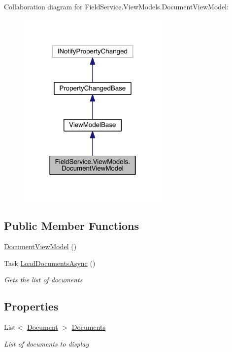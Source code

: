 Collaboration diagram for Field\+Service.\+View\+Models.\+Document\+View\+Model\+:
\nopagebreak
\begin{figure}[H]
\begin{center}
\leavevmode
\includegraphics[width=210pt]{class_field_service_1_1_view_models_1_1_document_view_model__coll__graph}
\end{center}
\end{figure}
\subsection*{Public Member Functions}
\begin{DoxyCompactItemize}
\item 
\hyperlink{class_field_service_1_1_view_models_1_1_document_view_model_a604167c882b35aafc386b35aad6e197e}{Document\+View\+Model} ()
\item 
Task \hyperlink{class_field_service_1_1_view_models_1_1_document_view_model_ae79f1abe88610667e547cfd5dd6f6f9d}{Load\+Documents\+Async} ()
\begin{DoxyCompactList}\small\item\em Gets the list of documents \end{DoxyCompactList}\end{DoxyCompactItemize}
\subsection*{Properties}
\begin{DoxyCompactItemize}
\item 
List$<$ \hyperlink{class_field_service_1_1_data_1_1_document}{Document} $>$ \hyperlink{class_field_service_1_1_view_models_1_1_document_view_model_a808fe9edb51b193c727cce909135ea7c}{Documents}
\begin{DoxyCompactList}\small\item\em List of documents to display \end{DoxyCompactList}\end{DoxyCompactItemize}
